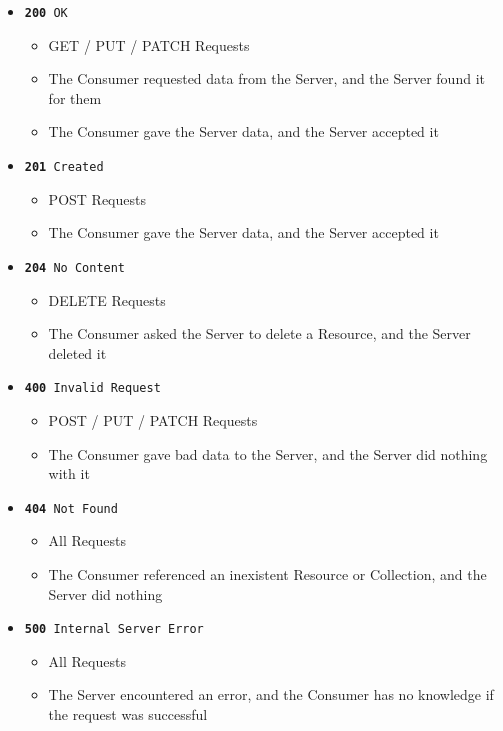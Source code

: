 \documentclass{book}
\begin{document}
\begin{itemize}
\item \texttt{\textbf{200} OK}
    \begin{itemize}
    \item GET / PUT / PATCH  Requests
    \item The Consumer requested data from the Server, and the Server found it for them
    \item The Consumer gave the Server data, and the Server accepted it
    \end{itemize}
\item \texttt{\textbf{201} Created}
    \begin{itemize}
    \item POST Requests
    \item The Consumer gave the Server data, and the Server accepted it
    \end{itemize}
\item \texttt{\textbf{204} No Content}
    \begin{itemize}
    \item DELETE Requests
    \item The Consumer asked the Server to delete a Resource, and the Server deleted it
    \end{itemize}
\item \texttt{\textbf{400} Invalid Request}
    \begin{itemize}
    \item POST / PUT / PATCH Requests
    \item The Consumer gave bad data to the Server, and the Server did nothing with it
    \end{itemize}
\item \texttt{\textbf{404} Not Found}
    \begin{itemize}
    \item All Requests
    \item The Consumer referenced an inexistent Resource or Collection, and the Server did nothing
    \end{itemize}
\item \texttt{\textbf{500} Internal Server Error}
    \begin{itemize}
    \item All Requests
    \item The Server encountered an error, and the Consumer has no knowledge if the request was successful
    \end{itemize}
\end{itemize}
\end{document}
